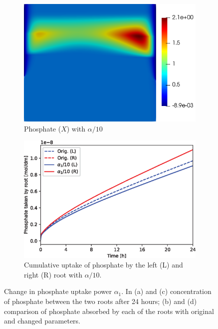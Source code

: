 \documentclass[11pt]{article}
\numberwithin{equation}{section}
\begin{document}
\begin{figure}[!htb]
\begin{subfigure}[t]{0.35\textwidth}
    \includegraphics[width=\textwidth]{Figures/X_alpha1divby10.png}
    \caption{Phosphate ($X$) with $\alpha / 10$}
    \label{fig:numexp_a1_down1}
\end{subfigure}
\hspace{1cm}
\begin{subfigure}[t]{0.4\textwidth}
    \includegraphics[width=\textwidth]{Figures/alpha1divby10.eps}
    \caption{Cumulative uptake of phosphate by the left (L) and right (R) root with $\alpha / 10$.}
    \label{fig:numexp_a1_down2}
\end{subfigure}

\caption{Change in phosphate uptake power $\alpha_1$. In (a) and (c) concentration of phosphate between the two roots after 24 hours; (b) and (d) comparison of phosphate absorbed by each of the roots with original and changed parameters.}
\end{figure}
\end{document}

